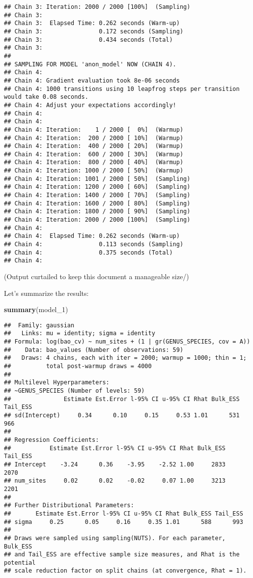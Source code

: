 \documentclass[
]{article}
\newenvironment{Shaded}{\begin{snugshade}}{\end{snugshade}}
\newcommand{\FunctionTok}[1]{\textcolor[rgb]{0.13,0.29,0.53}{\textbf{#1}}}
\newcommand{\NormalTok}[1]{#1}
\begin{document}
\begin{verbatim}
## Chain 3: Iteration: 2000 / 2000 [100%]  (Sampling)
## Chain 3: 
## Chain 3:  Elapsed Time: 0.262 seconds (Warm-up)
## Chain 3:                0.172 seconds (Sampling)
## Chain 3:                0.434 seconds (Total)
## Chain 3: 
## 
## SAMPLING FOR MODEL 'anon_model' NOW (CHAIN 4).
## Chain 4: 
## Chain 4: Gradient evaluation took 8e-06 seconds
## Chain 4: 1000 transitions using 10 leapfrog steps per transition would take 0.08 seconds.
## Chain 4: Adjust your expectations accordingly!
## Chain 4: 
## Chain 4: 
## Chain 4: Iteration:    1 / 2000 [  0%]  (Warmup)
## Chain 4: Iteration:  200 / 2000 [ 10%]  (Warmup)
## Chain 4: Iteration:  400 / 2000 [ 20%]  (Warmup)
## Chain 4: Iteration:  600 / 2000 [ 30%]  (Warmup)
## Chain 4: Iteration:  800 / 2000 [ 40%]  (Warmup)
## Chain 4: Iteration: 1000 / 2000 [ 50%]  (Warmup)
## Chain 4: Iteration: 1001 / 2000 [ 50%]  (Sampling)
## Chain 4: Iteration: 1200 / 2000 [ 60%]  (Sampling)
## Chain 4: Iteration: 1400 / 2000 [ 70%]  (Sampling)
## Chain 4: Iteration: 1600 / 2000 [ 80%]  (Sampling)
## Chain 4: Iteration: 1800 / 2000 [ 90%]  (Sampling)
## Chain 4: Iteration: 2000 / 2000 [100%]  (Sampling)
## Chain 4: 
## Chain 4:  Elapsed Time: 0.262 seconds (Warm-up)
## Chain 4:                0.113 seconds (Sampling)
## Chain 4:                0.375 seconds (Total)
## Chain 4:
\end{verbatim}

(Output curtailed to keep this document a manageable size/)

Let's summarize the results:

\begin{Shaded}
\begin{Highlighting}[]
\FunctionTok{summary}\NormalTok{(model\_1)}
\end{Highlighting}
\end{Shaded}

\begin{verbatim}
##  Family: gaussian 
##   Links: mu = identity; sigma = identity 
## Formula: log(bao_cv) ~ num_sites + (1 | gr(GENUS_SPECIES, cov = A)) 
##    Data: bao_values (Number of observations: 59) 
##   Draws: 4 chains, each with iter = 2000; warmup = 1000; thin = 1;
##          total post-warmup draws = 4000
## 
## Multilevel Hyperparameters:
## ~GENUS_SPECIES (Number of levels: 59) 
##               Estimate Est.Error l-95% CI u-95% CI Rhat Bulk_ESS Tail_ESS
## sd(Intercept)     0.34      0.10     0.15     0.53 1.01      531      966
## 
## Regression Coefficients:
##           Estimate Est.Error l-95% CI u-95% CI Rhat Bulk_ESS Tail_ESS
## Intercept    -3.24      0.36    -3.95    -2.52 1.00     2833     2070
## num_sites     0.02      0.02    -0.02     0.07 1.00     3213     2201
## 
## Further Distributional Parameters:
##       Estimate Est.Error l-95% CI u-95% CI Rhat Bulk_ESS Tail_ESS
## sigma     0.25      0.05     0.16     0.35 1.01      588      993
## 
## Draws were sampled using sampling(NUTS). For each parameter, Bulk_ESS
## and Tail_ESS are effective sample size measures, and Rhat is the potential
## scale reduction factor on split chains (at convergence, Rhat = 1).
\end{verbatim}
\end{document}
